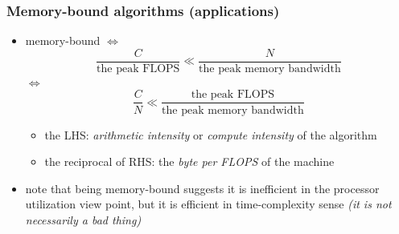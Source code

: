 \documentclass[12pt,dvipdfmx]{beamer}
\newcommand{\ao}[1]{{\color{blue}#1}}
\begin{document}
\begin{frame}[fragile]
  \frametitle{Memory-bound algorithms (applications)}
\begin{itemize}
\item memory-bound $\iff$
  \[
    \frac{C}{\mbox{the peak FLOPS}}
    \ll \frac{N}{\mbox{the peak memory bandwidth}}
  \]
  $\iff$
  \[ \frac{C}{N} \ll \frac{\mbox{the peak FLOPS}}{\mbox{the peak memory bandwidth}} \]
  \begin{itemize}
  \item the LHS: \ao{\it arithmetic intensity} or
    \ao{\it compute intensity} of the algorithm
  \item the reciprocal of RHS: the \ao{\it byte per FLOPS}
    of the machine
  \end{itemize}

\item note that being memory-bound suggests it is
  inefficient in the processor utilization view point,
  but it is efficient in
  time-complexity sense \ao{\it (it is not necessarily a bad thing)}
\end{itemize}
\end{frame}
\end{document}
